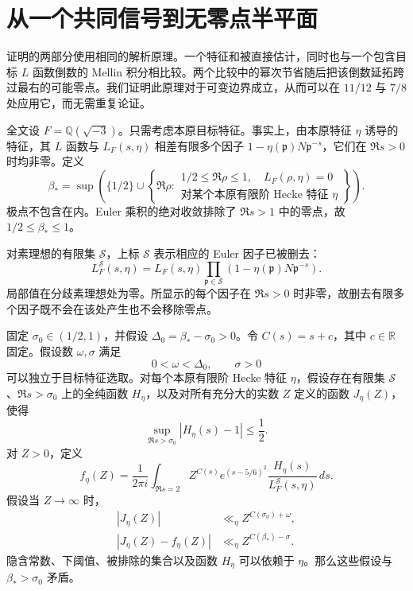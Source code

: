 \section{从一个共同信号到无零点半平面}
\label{sec:analytic-reduction}

证明的两部分使用相同的解析原理。一个特征和被直接估计，同时也与一个包含目标 $L$ 函数倒数的 Mellin 积分相比较。两个比较中的幂次节省随后把该倒数延拓跨过最右的可能零点。我们证明此原理对于可变边界成立，从而可以在 $11/12$ 与 $7/8$ 处应用它，而无需重复论证。

全文设 $F=\mathbb Q(\sqrt{-3})$。只需考虑本原目标特征。事实上，由本原特征 $\eta$ 诱导的特征，其 $L$ 函数与 $L_F(s,\eta)$ 相差有限多个因子 $1-\eta(\mathfrak p)N\mathfrak p^{-s}$，它们在 $\Re s>0$ 时均非零。定义
\begin{equation}
 \beta_* = \sup\left(\{1/2\}\cup
 \left\{\Re\rho:\begin{array}{l}
  1/2\le\Re\rho\le1,\quad L_F(\rho,\eta)=0\\
  \text{对某个本原有限阶 Hecke 特征 }\eta
 \end{array}\right\}\right).
 \label{old-eq:1.1b}
\end{equation}
极点不包含在内。Euler 乘积的绝对收敛排除了 $\Re s>1$ 中的零点，故 $1/2\le\beta_*\le1$。

对素理想的有限集 $\mathcal S$，上标 $\mathcal S$ 表示相应的 Euler 因子已被删去：
\[
 L_F^{\mathcal S}(s,\eta)
 =L_F(s,\eta)\prod_{\mathfrak p\in\mathcal S}
       (1-\eta(\mathfrak p)N\mathfrak p^{-s}).
\]
局部值在分歧素理想处为零。所显示的每个因子在 $\Re s>0$ 时非零，故删去有限多个因子既不会在该处产生也不会移除零点。

\begin{proposition}[从共同信号出发的延拓]
\label{lem:continuation-criterion}
固定 $\sigma_0\in(1/2,1)$，并假设 $\Delta_0=\beta_*-\sigma_0>0$。令 $C(s)=s+c$，其中 $c\in\mathbb R$ 固定。假设数 $\omega,\sigma$ 满足
\[
 0<\omega<\Delta_0,\qquad \sigma>0
\]
可以独立于目标特征选取。对每个本原有限阶 Hecke 特征 $\eta$，假设存在有限集 $\mathcal S$、$\Re s>\sigma_0$ 上的全纯函数 $H_\eta$，以及对所有充分大的实数 $Z$ 定义的函数 $J_\eta(Z)$，使得
\begin{equation}
 \sup_{\Re s>\sigma_0}|H_\eta(s)-1|\le\frac12.
 \label{eq:signal-euler-contract}
\end{equation}
对 $Z>0$，定义
\begin{equation}
 f_\eta(Z)=\frac1{2\pi i}\int_{\Re s=2}
 Z^{C(s)}e^{(s-5/6)^2}
 \frac{H_\eta(s)}{L_F^{\mathcal S}(s,\eta)}\,ds.
 \label{eq:common-residue}
\end{equation}
假设当 $Z\to\infty$ 时，
\begin{align}
 |J_\eta(Z)|&\ll_\eta Z^{C(\sigma_0)+\omega},
       \label{eq:low-probe-contract}\\
 |J_\eta(Z)-f_\eta(Z)|&\ll_\eta Z^{C(\beta_*)-\sigma}.
       \label{eq:high-probe-contract}
\end{align}
隐含常数、下阈值、被排除的集合以及函数 $H_\eta$ 可以依赖于 $\eta$。那么这些假设与 $\beta_*>\sigma_0$ 矛盾。
\end{proposition}

